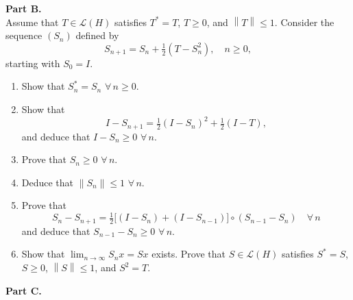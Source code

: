 \documentclass[12pt]{article}
\newcommand{\norm}[1]{\left\|#1\right\|}
\begin{document}
\noindent\textbf{Part B.}\\
Assume that $T \in \mathcal{L}(H)$ satisfies $T^* = T$, $T \ge 0$, and $\norm{T} \le 1$. Consider the
sequence $(S_n)$ defined by
\[
S_{n+1} = S_n + \tfrac{1}{2}(T - S_n^2), \quad n \ge 0,
\]
starting with $S_0 = I$.
 
\begin{enumerate}
\item Show that $S_n^* = S_n$ $\forall\, n \ge 0$.
 
\item Show that
\[
I - S_{n+1} = \tfrac{1}{2}(I - S_n)^2 + \tfrac{1}{2}(I - T),
\]
and deduce that $I - S_n \ge 0$ $\forall\, n$.
 
\item Prove that $S_n \ge 0$ $\forall\, n$.
 
 
\item Deduce that $\norm{S_n} \le 1$ $\forall\, n$.
 
\item Prove that
\[
S_n - S_{n+1} = \tfrac{1}{2}\bigl[(I - S_n) + (I - S_{n-1})\bigr] \circ (S_{n-1} - S_n) \quad \forall\, n
\]
and deduce that $S_{n-1} - S_n \ge 0$ $\forall\, n$.
 
\noindent[\textit{Hint:} Show by induction that $(I - S_n) = P_n(I-T)$ and $(S_{n-1} - S_n) = Q_n(I-T)$,
where $P_n$ and $Q_n$ are polynomials with nonnegative coefficients.]
 
\item Show that $\lim_{n\to\infty} S_n x = Sx$ exists. Prove that $S \in \mathcal{L}(H)$ satisfies
$S^* = S$, $S \ge 0$, $\norm{S} \le 1$, and $S^2 = T$.
\end{enumerate}
 
\noindent\textbf{Part C.}
 
\end{document}
